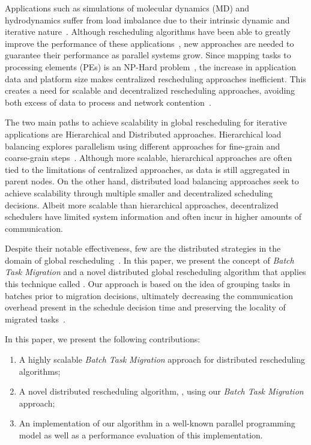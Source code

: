 Applications such as simulations of molecular dynamics (MD) and hydrodynamics suffer from load imbalance due to their intrinsic dynamic and iterative nature~\cite{namd,IPDPS13:LULESH}.
Although rescheduling algorithms have been able to greatly improve the performance of these applications~\cite{namd}, new approaches are needed to guarantee their performance as parallel systems grow.
Since mapping tasks to processing elements (PEs) is an NP-Hard problem~\cite{npcomplete}, the increase in application data and platform size makes centralized rescheduling approaches inefficient.
This creates a need for scalable and decentralized rescheduling approaches, avoiding both excess of data to process and network contention~\cite{trahay2009scalable}.

The two main paths to achieve scalability in global rescheduling for iterative applications are Hierarchical and Distributed approaches.
Hierarchical load balancing explores parallelism using different approaches for fine-grain and coarse-grain steps~\cite{hybrid}.
Although more scalable, hierarchical approaches are often tied to the limitations of centralized approaches, as data is still aggregated in parent nodes.
On the other hand, distributed load balancing approaches seek to achieve scalability through multiple smaller and decentralized scheduling decisions.
Albeit more scalable than hierarchical approaches, decentralized schedulers have limited system information and often incur in higher amounts of communication.

Despite their notable effectiveness, few are the distributed strategies in the domain of global rescheduling~\cite{diffus,grapevine}.
In this paper, we present the concept of \textit{Batch Task Migration} and a novel distributed global rescheduling algorithm that applies this technique called \packdrop.
Our approach is based on the idea of grouping tasks in batches prior to migration decisions, ultimately decreasing the communication overhead present in the schedule decision time and preserving the locality of migrated tasks~\cite{Paudel2013wslocal}.

In this paper, we present the following contributions: 
\begin{enumerate}
	\item A highly scalable \textit{Batch Task Migration} approach for distributed rescheduling algorithms;
	\item A novel distributed rescheduling algorithm, \packdrop, using our \textit{Batch Task Migration} approach;
	\item An implementation of our algorithm in a well-known parallel programming model as well as a performance evaluation of this implementation.
\end{enumerate}

